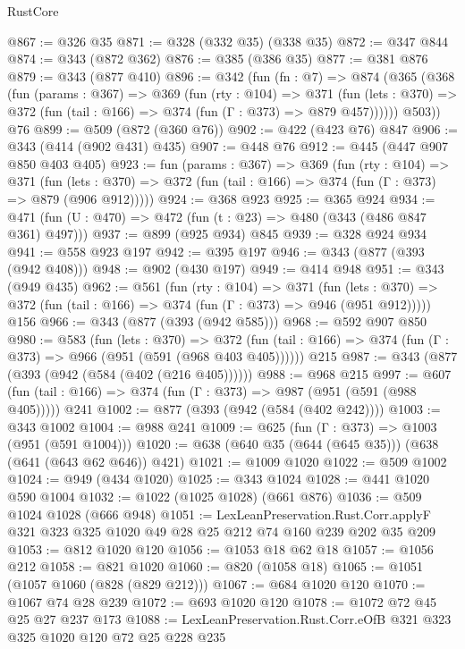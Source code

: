 \begin{lexlean}{RustCore}
\begin{coremodule}
@867 := @326 @35
@871 := @328 (@332 @35) (@338 @35)
@872 := @347 @844
@874 := @343 (@872 @362)
@876 := @385 (@386 @35)
@877 := @381 @876
@879 := @343 (@877 @410)
@896 := @342
    (fun (fn : @7) =>
    @874
      (@365
        (@368
          (fun (params : @367) =>
          @369
            (fun (rty : @104) =>
            @371
              (fun (lets : @370) =>
              @372 (fun (tail : @166) => @374 (fun (Γ : @373) => @879 @457))))))
        @503))
    @76
@899 := @509 (@872 (@360 @76))
@902 := @422 (@423 @76) @847
@906 := @343 (@414 (@902 @431) @435)
@907 := @448 @76
@912 := @445 (@447 @907 @850 @403 @405)
@923 := fun (params : @367) =>
  @369
    (fun (rty : @104) =>
    @371
      (fun (lets : @370) => @372 (fun (tail : @166) => @374 (fun (Γ : @373) => @879 (@906 @912)))))
@924 := @368 @923
@925 := @365 @924
@934 := @471 (fun (U : @470) => @472 (fun (t : @23) => @480 (@343 (@486 @847 @361) @497)))
@937 := @899 (@925 @934) @845
@939 := @328 @924 @934
@941 := @558 @923 @197
@942 := @395 @197
@946 := @343 (@877 (@393 (@942 @408)))
@948 := @902 (@430 @197)
@949 := @414 @948
@951 := @343 (@949 @435)
@962 := @561
    (fun (rty : @104) =>
    @371
      (fun (lets : @370) => @372 (fun (tail : @166) => @374 (fun (Γ : @373) => @946 (@951 @912)))))
    @156
@966 := @343 (@877 (@393 (@942 @585)))
@968 := @592 @907 @850
@980 := @583
    (fun (lets : @370) =>
    @372 (fun (tail : @166) => @374 (fun (Γ : @373) => @966 (@951 (@591 (@968 @403 @405))))))
    @215
@987 := @343 (@877 (@393 (@942 (@584 (@402 (@216 @405))))))
@988 := @968 @215
@997 := @607 (fun (tail : @166) => @374 (fun (Γ : @373) => @987 (@951 (@591 (@988 @405))))) @241
@1002 := @877 (@393 (@942 (@584 (@402 @242))))
@1003 := @343 @1002
@1004 := @988 @241
@1009 := @625 (fun (Γ : @373) => @1003 (@951 (@591 @1004)))
@1020 := @638 (@640 @35 (@644 (@645 @35))) (@638 (@641 (@643 @62 @646)) @421)
@1021 := @1009 @1020
@1022 := @509 @1002
@1024 := @949 (@434 @1020)
@1025 := @343 @1024
@1028 := @441 @1020 @590 @1004
@1032 := @1022 (@1025 @1028) (@661 @876)
@1036 := @509 @1024 @1028 (@666 @948)
@1051 := LexLeanPreservation.Rust.Corr.applyF
    @321
    @323
    @325
    @1020
    @49
    @28
    @25
    @212
    @74
    @160
    @239
    @202
    @35
    @209
@1053 := @812 @1020 @120
@1056 := @1053 @18 @62 @18
@1057 := @1056 @212
@1058 := @821 @1020
@1060 := @820 (@1058 @18)
@1065 := @1051 (@1057 @1060 (@828 (@829 @212)))
@1067 := @684 @1020 @120
@1070 := @1067 @74 @28 @239
@1072 := @693 @1020 @120
@1078 := @1072 @72 @45 @25 @27 @237 @173
@1088 := LexLeanPreservation.Rust.Corr.eOfB @321 @323 @325 @1020 @120 @72 @25 @228 @235

\end{coremodule}
\end{lexlean}
